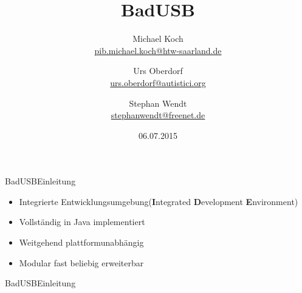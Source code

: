 \documentclass[xcolor=dvipsnames,pdftex]{beamer}
\title %
{BadUSB}
\author{Michael Koch\\
\href{mailto:pib.michael.koch@htw-saarland.de}{pib.michael.koch@htw-saarland.de}\\
\and{Urs Oberdorf\\
\href{mailto:urs.oberdorf@autistici.org}{urs.oberdorf@autistici.org}}\\
\and{Stephan Wendt\\
\href{mailto:stephanwendt@freenet.de}{stephanwendt@freenet.de}}}
\institute %
{
	Fakultät für Ingenieurwissenschaften\\
	Hochschule für Technik und Wirtschaft des Saarlandes
}
\date  %
{06.07.2015}
\begin{document}
\begin{frame}
	\titlepage
\end{frame}







\begin{frame}{BadUSB}{Einleitung}
	\begin{itemize}
		\item \glqq Integrierte Entwicklungsumgebung\grqq (\textbf{I}ntegrated \textbf{D}evelopment
			\textbf{E}nvironment)
			\pause
		\item Vollständig in Java implementiert
			\pause
		\item Weitgehend plattformunabhängig
			\pause
		\item Modular fast beliebig erweiterbar
	\end{itemize}
\end{frame}

\begin{frame}{BadUSB}{Einleitung}
	\begin{itemize}
	\end{itemize}
\end{frame}
\end{document}
